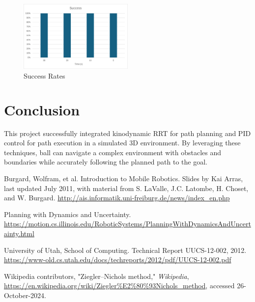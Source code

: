 \documentclass[12pt]{article}
\begin{document}
\begin{figure}[h!]
    \centering
    \includegraphics[width=0.5\textwidth]{./images/success.png}
    \caption{Success Rates}
    \label{fig:Succees Rates}
\end{figure}

\section{Conclusion}
This project successfully integrated kinodynamic RRT for path planning and PID control for path execution in a simulated 3D environment. By leveraging these techniques, ball can navigate a complex environment with obstacles and boundaries while accurately following the planned path to the goal.

\begin{thebibliography}{}
\raggedright

Burgard, Wolfram, et al. Introduction to Mobile Robotics. Slides by Kai Arras, last updated July 2011, with material from S. LaValle, J.C. Latombe, H. Choset, and W. Burgard. \href{http://ais.informatik.uni-freiburg.de/news/index_en.php}{http://ais.informatik.uni-freiburg.de/news/index\_en.php}

Planning with Dynamics and Uncertainty. \href{https://motion.cs.illinois.edu/RoboticSystems/PlanningWithDynamicsAndUncertainty.html}
{https://motion.cs.illinois.edu/RoboticSystems/PlanningWithDynamicsAndUncertainty.html}

University of Utah, School of Computing. Technical Report UUCS-12-002, 2012. \href{https://www-old.cs.utah.edu/docs/techreports/2012/pdf/UUCS-12-002.pdf}{https://www-old.cs.utah.edu/docs/techreports/2012/pdf/UUCS-12-002.pdf}

Wikipedia contributors, "Ziegler–Nichols method," \textit{Wikipedia},
\url{https://en.wikipedia.org/wiki/Ziegler%E2%80%93Nichols_method}, accessed 26-October-2024.

\end{thebibliography}
\end{document}
